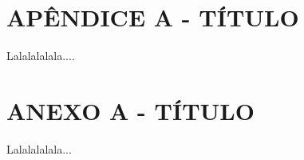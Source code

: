 \documentclass[
	12pt,				%
	oneside,			%
	a4paper,			%
	english,			%
	french,				%
	spanish,			%
	brazil,				%
	]{abntex2}
\theoremstyle{plain}
\theoremstyle{definition}
\begin{document}
\chapter*[Apêndice]{APÊNDICE A - TÍTULO}

Lalalalalala....









\chapter*[Anexos]{ANEXO A - TÍTULO}

Lalalalalala...






\printindex
\end{document}
